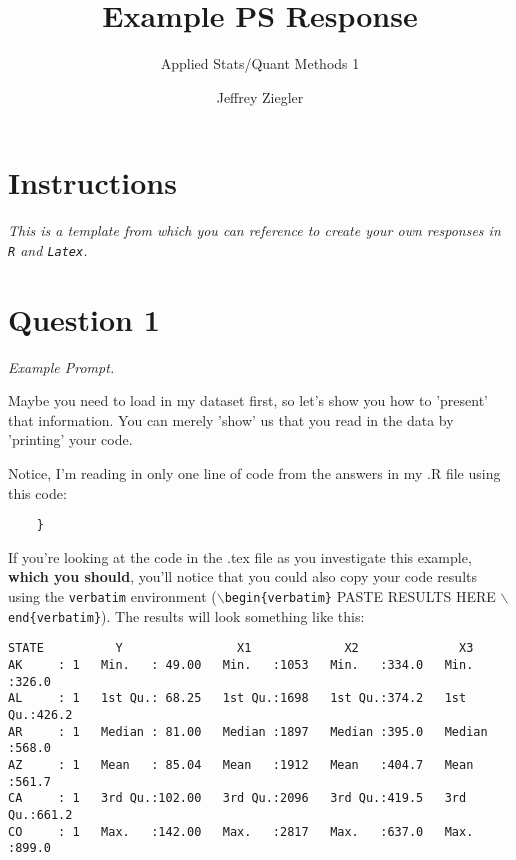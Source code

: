 \documentclass[12pt,letterpaper]{article}
\title{Example PS Response}
\date{Jeffrey Ziegler}
\author{Applied Stats/Quant Methods 1}
\begin{document}
	\maketitle
	
	\section*{Instructions}

 \textit{This is a template from which you can reference to create your own responses in \texttt{R} and \texttt{Latex}.}

\section*{Question 1 }

\textit{Example Prompt.}\\

\vspace{.25cm}

\noindent Maybe you need to load in my dataset first, so let's show you how to 'present' that information. You can merely 'show' us that you read in the data by 'printing' your code. \\

  

\vspace{.25cm}

\noindent Notice, I'm reading in only one line of code from the answers in my .R file using this code: 

\begin{verbatim}
	}
\end{verbatim}

\noindent If you're looking at the code in the .tex file as you investigate this example, \textbf{which you should}, you'll notice that you could also copy your code results using the \texttt{verbatim} environment (\texttt{$\backslash$begin\{verbatim\}} PASTE RESULTS HERE \texttt{$\backslash$end\{verbatim\}}). The results will look something like this:


\begin{verbatim}
STATE          Y                X1             X2              X3       
AK     : 1   Min.   : 49.00   Min.   :1053   Min.   :334.0   Min.   :326.0  
AL     : 1   1st Qu.: 68.25   1st Qu.:1698   1st Qu.:374.2   1st Qu.:426.2  
AR     : 1   Median : 81.00   Median :1897   Median :395.0   Median :568.0  
AZ     : 1   Mean   : 85.04   Mean   :1912   Mean   :404.7   Mean   :561.7  
CA     : 1   3rd Qu.:102.00   3rd Qu.:2096   3rd Qu.:419.5   3rd Qu.:661.2  
CO     : 1   Max.   :142.00   Max.   :2817   Max.   :637.0   Max.   :899.0  
\end{verbatim}
\vspace{.5cm}
\end{document}
